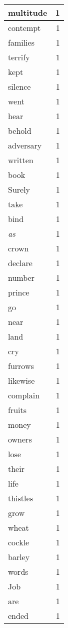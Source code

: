 \begin{center}
\begin{longtable}{l|r}
multitude & 1 \\ \hline
contempt & 1 \\ \hline
families & 1 \\ \hline
terrify & 1 \\ \hline
kept & 1 \\ \hline
silence & 1 \\ \hline
went & 1 \\ \hline
hear & 1 \\ \hline
behold & 1 \\ \hline
adversary & 1 \\ \hline
written & 1 \\ \hline
book & 1 \\ \hline
Surely & 1 \\ \hline
take & 1 \\ \hline
bind & 1 \\ \hline
\emph{as} & 1 \\ \hline
crown & 1 \\ \hline
declare & 1 \\ \hline
number & 1 \\ \hline
prince & 1 \\ \hline
go & 1 \\ \hline
near & 1 \\ \hline
land & 1 \\ \hline
cry & 1 \\ \hline
furrows & 1 \\ \hline
likewise & 1 \\ \hline
complain & 1 \\ \hline
fruits & 1 \\ \hline
money & 1 \\ \hline
owners & 1 \\ \hline
lose & 1 \\ \hline
their & 1 \\ \hline
life & 1 \\ \hline
thistles & 1 \\ \hline
grow & 1 \\ \hline
wheat & 1 \\ \hline
cockle & 1 \\ \hline
barley & 1 \\ \hline
words & 1 \\ \hline
Job & 1 \\ \hline
are & 1 \\ \hline
ended & 1 \\ \hline
\end{longtable}
\end{center}



